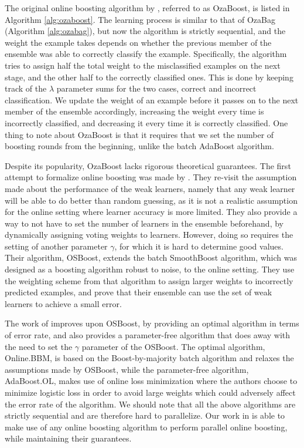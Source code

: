 The original online boosting algorithm by \citeauthor{Oza2001online}, referred to as
OzaBoost, is listed
in Algorithm \ref{alg:ozaboost}.
The learning process is similar to that of OzaBag (Algorithm \ref{alg:ozabag}), but now the
algorithm is strictly sequential, and the weight the example takes depends on whether
the previous member of the ensemble was able to correctly classify the example.
Specifically, the algorithm tries to assign half the total weight to the misclassified
examples on the next stage, and the other half to the correctly classified ones.
This is done by keeping track of the $\lambda$ parameter sums for the two cases,
correct and incorrect classification. We update the weight of an example
before it passes on to the next member of the ensemble accordingly, increasing
the weight every time is incorrectly classified, and decreasing it every time it
is correctly classified.  One thing to note about OzaBoost is that it requires
that we set the number of boosting rounds from the beginning, unlike the
batch AdaBoost algorithm.

Despite its popularity, OzaBoost lacks rigorous theoretical guarantees.
The first attempt to formalize online boosting was made by \citet{online-boosting-theoretical}.
They re-visit the assumption made about the performance of the weak
learners, namely that any weak learner will be able to
do better than random guessing, as it is not a realistic assumption
for the online setting where learner accuracy is more limited. They also
provide a way to not have to set the number of learners in the ensemble beforehand,
by dynamically assigning voting weights to learners.
However, doing so requires the setting of another parameter $\gamma$,
for which it is hard to determine good values.
Their algorithm, OSBoost,
extends the batch SmoothBoost \cite{smoothboost} algorithm, which
was designed as a boosting algorithm robust to noise, to the online
setting. They use the weighting scheme from that algorithm to assign
larger weights to incorrectly predicted examples, and prove that
their ensemble can use the set of weak learners to achieve a small
error.

The work of \citet{Beygelzimer2015optimal} improves upon OSBoost,
by providing an optimal algorithm in terms of error rate, and also provides
a parameter-free algorithm that does away with the need to set the $\gamma$
parameter of the OSBoost.
The optimal algorithm, Online.BBM, is based on the Boost-by-majority batch
algorithm \cite{batch-bbm} and relaxes the assumptions made by OSBoost,
while the parameter-free algorithm, AdaBoost.OL, makes use of online
loss minimization where the authors choose to minimize logistic loss
in order to avoid large weights which could adversely affect the
error rate of the algorithm.
We should note that all the above algorithms are strictly sequential
and are therefore hard to parallelize.
Our work in \boostvht is able to
make use of any online boosting algorithm to perform
parallel online boosting, while maintaining their guarantees.


